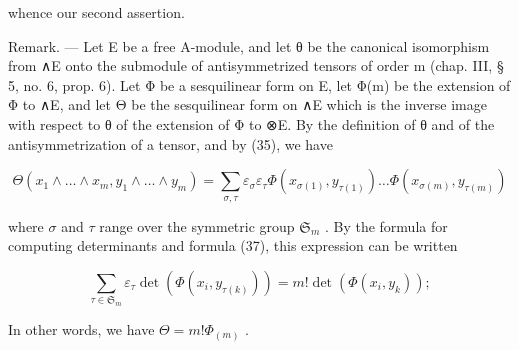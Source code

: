 whence our second assertion.

Remark. --- Let E be a free A-module, and let θ be the canonical isomorphism from ∧E onto the submodule of antisymmetrized tensors of order m (chap. III, § 5, no. 6, prop. 6). Let Φ be a sesquilinear form on E, let Φ(m) be the extension of Φ to ∧E, and let Θ be the sesquilinear form on ∧E which is the inverse image with respect to θ of the extension of Φ to ⊗E. By the definition of θ and of the antisymmetrization of a tensor, and by (35), we have

\[
\Theta (x _ {1} \wedge \dots \wedge x _ {m}, y _ {1} \wedge \dots \wedge y _ {m}) = \sum_ {\sigma , \tau} \varepsilon_ {\sigma} \varepsilon_ {\tau} \Phi (x _ {\sigma (1)}, y _ {\tau (1)}) \dots \Phi (x _ {\sigma (m)}, y _ {\tau (m)})
\]

where \(\sigma\) and \(\tau\) range over the symmetric group \(\mathfrak{S}_{m}\) . By the formula for computing determinants and formula (37), this expression can be written

\[
\sum_ {\tau \in \mathfrak {S} _ {m}} \varepsilon_ {\tau} \det (\Phi (x _ {i}, y _ {\tau (k)})) = m! \det (\Phi (x _ {i}, y _ {k}));
\]

In other words, we have \(\Theta = m!\Phi_{(m)}\) .

